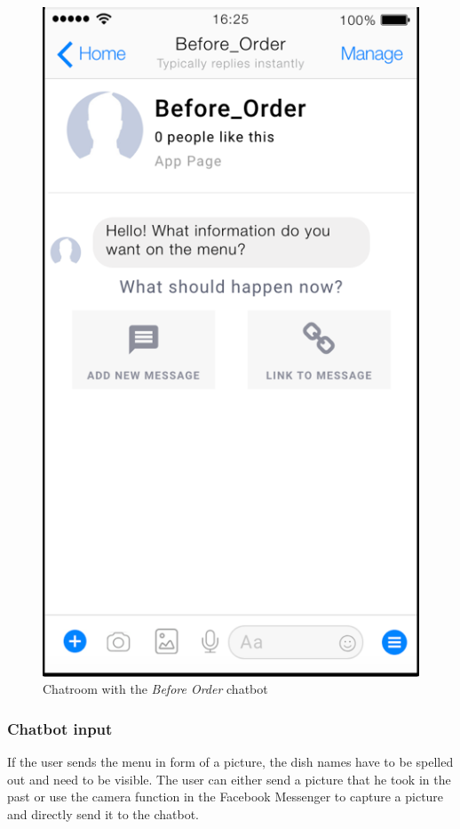 \begin{figure}[htbp]
\centerline{\includegraphics[height=\custompicheight]{./pictures/facebook_message}}
\caption{Chatroom with the \emph{Before Order} chatbot}
\label{fig:facebook_message}
\end{figure}
\FloatBarrier

\subsubsection{Chatbot input}

If the user sends the menu in form of a picture, the dish names have to be spelled out and need to be visible. The user can either send a picture that he took in the past or use the camera function in the Facebook Messenger to capture a picture and directly send it to the chatbot.

